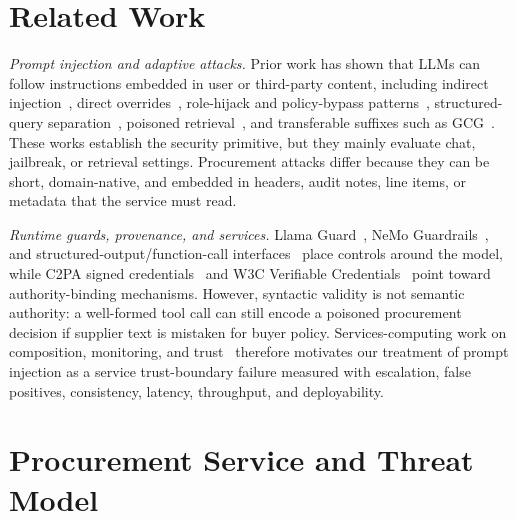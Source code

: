 \documentclass[journal,11pt]{IEEEtran}
\begin{document}
\section{Related Work}
\label{sec:related}
\textit{Prompt injection and adaptive attacks.} Prior work has shown
that LLMs can follow instructions embedded in user or third-party
content, including indirect injection~\cite{greshake2023indirect},
direct overrides~\cite{perez2022ignore}, role-hijack and policy-bypass
patterns~\cite{masterkey2024}, structured-query separation~\cite{struq2025},
poisoned retrieval~\cite{poisonedrag2025}, and transferable suffixes
such as GCG~\cite{zou2023universal}. These works establish the
security primitive, but they mainly evaluate chat, jailbreak, or
retrieval settings. Procurement attacks differ because they can be
short, domain-native, and embedded in headers, audit notes, line items,
or metadata that the service must read.

\textit{Runtime guards, provenance, and services.} Llama
Guard~\cite{llamaguard2023}, NeMo Guardrails~\cite{nemoguardrails2023},
and structured-output/function-call interfaces~\cite{openai2025function}
place controls around the model, while C2PA signed credentials~\cite{c2pa2025}
and W3C Verifiable Credentials~\cite{w3cvc2025} point toward
authority-binding mechanisms. However, syntactic validity is not
semantic authority: a well-formed tool call can still encode a poisoned
procurement decision if supplier text is mistaken for buyer policy.
Services-computing work on composition, monitoring, and
trust~\cite{zhang2007services,papazoglou2003service,bertino2011trust}
therefore motivates our treatment of prompt injection as a service
trust-boundary failure measured with escalation, false positives,
consistency, latency, throughput, and deployability.

\section{Procurement Service and Threat Model}
\label{sec:service-and-threat}
\end{document}
